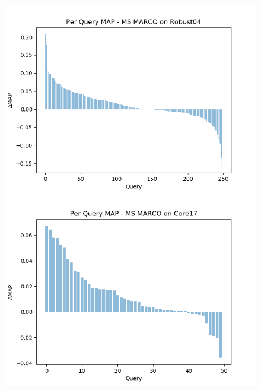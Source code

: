 \begin{figure}[t!]
	\centering
    \begin{minipage}{0.33\textwidth}
        \centering
        \includegraphics[width=\textwidth]{figures/perquery10.png}
    \end{minipage}\hfill
    \begin{minipage}{0.33\textwidth}
        \centering
        \includegraphics[width=\textwidth]{figures/perquery11.png}
    \end{minipage}\hfill
    \begin{minipage}{0.33\textwidth}
        \centering

\end{minipage}
\end{figure}
